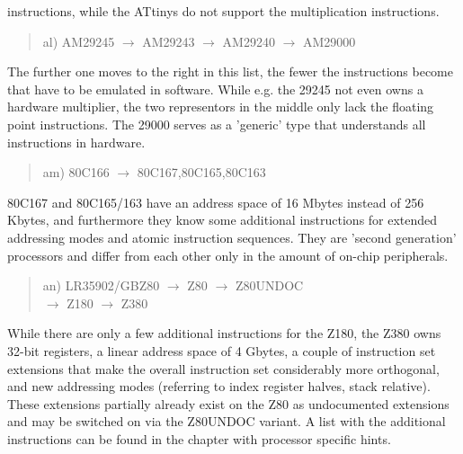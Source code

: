 \documentclass[12pt,twoside]{report}
\begin{document}
instructions, while the ATtinys do not support the multiplication
instructions.
\begin{quote}
al) AM29245 $\rightarrow$ AM29243 $\rightarrow$ AM29240 $\rightarrow$ AM29000
\end{quote}
The further one moves to the right in this list, the fewer the
instructions become that have to be emulated in software.  While e.g.
the 29245 not even owns a hardware multiplier, the two representors in
the middle only lack the floating point instructions.  The 29000
serves as a 'generic' type that understands all instructions in
hardware.
\begin{quote}
am) 80C166 $\rightarrow$ 80C167,80C165,80C163
\end{quote}
80C167 and 80C165/163 have an address space of 16 Mbytes instead of 256
Kbytes, and furthermore they know some additional instructions for
extended addressing modes and atomic instruction sequences.  They are
'second generation' processors and differ from each other only in the
amount of on-chip peripherals.
\begin{quote}
an) LR35902/GBZ80 $\rightarrow$ Z80 $\rightarrow$ Z80UNDOC \\
    $\rightarrow$ Z180 $\rightarrow$ Z380
\end{quote}
While there are only a few additional instructions for the Z180, the
Z380 owns 32-bit registers, a linear address space of 4 Gbytes, a
couple of instruction set extensions that make the overall
instruction set considerably more orthogonal, and new addressing
modes (referring to index register halves, stack relative).  These
extensions partially already exist on the Z80 as undocumented
extensions and may be switched on via the Z80UNDOC variant.  A list
with the additional instructions can be found in the chapter
with processor specific hints.
\end{document}
